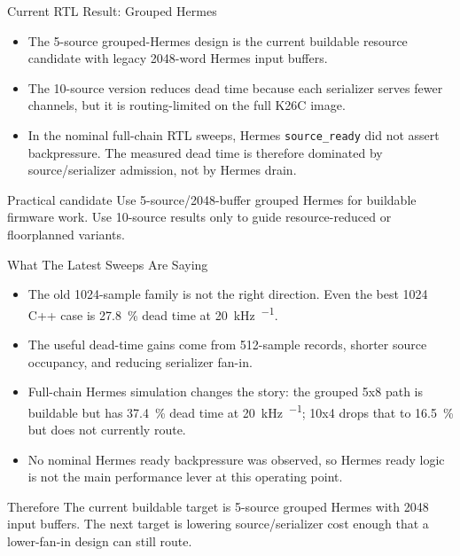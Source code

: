 \documentclass[aspectratio=169]{beamer}
\begin{document}
\begin{frame}{Current RTL Result: Grouped Hermes}
\footnotesize
\begin{itemize}
  \item The 5-source grouped-Hermes design is the current buildable resource candidate with legacy \num{2048}-word Hermes input buffers.
  \item The 10-source version reduces dead time because each serializer serves fewer channels, but it is routing-limited on the full K26C image.
  \item In the nominal full-chain RTL sweeps, Hermes \texttt{source\_ready} did not assert backpressure. The measured dead time is therefore dominated by source/serializer admission, not by Hermes drain.
\end{itemize}

\vspace{0.4em}
\begin{block}{Practical candidate}
Use 5-source/\num{2048}-buffer grouped Hermes for buildable firmware work. Use 10-source results only to guide resource-reduced or floorplanned variants.
\end{block}
\end{frame}

\begin{frame}{What The Latest Sweeps Are Saying}
\footnotesize
\begin{itemize}
  \item The old \num{1024}-sample family is not the right direction. Even the best \num{1024} C++ case is \SI{27.8}{\percent} dead time at \SI{20}{\kilo\hertz\per\channel}.
  \item The useful dead-time gains come from \num{512}-sample records, shorter source occupancy, and reducing serializer fan-in.
  \item Full-chain Hermes simulation changes the story: the grouped 5x8 path is buildable but has \SI{37.4}{\percent} dead time at \SI{20}{\kilo\hertz\per\channel}; 10x4 drops that to \SI{16.5}{\percent} but does not currently route.
  \item No nominal Hermes ready backpressure was observed, so Hermes ready logic is not the main performance lever at this operating point.
\end{itemize}

\vspace{0.3em}
\begin{alertblock}{Therefore}
The current buildable target is 5-source grouped Hermes with \num{2048} input buffers. The next target is lowering source/serializer cost enough that a lower-fan-in design can still route.
\end{alertblock}
\end{frame}
\end{document}
